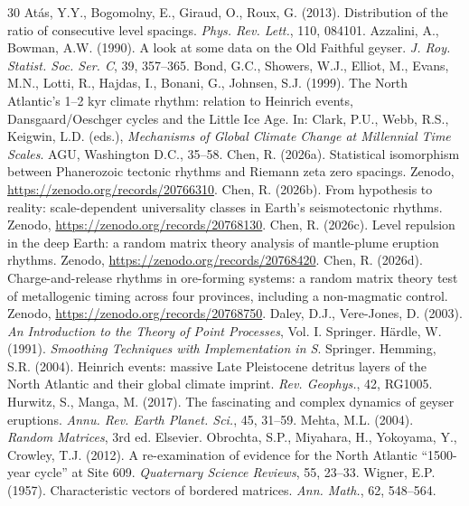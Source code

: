 \documentclass[12pt,a4paper]{article}
\begin{document}
\begin{thebibliography}{30}
 At\'as, Y.Y., Bogomolny, E., Giraud, O., Roux, G. (2013). Distribution of the ratio of consecutive level spacings. \textit{Phys. Rev. Lett.}, 110, 084101.
 Azzalini, A., Bowman, A.W. (1990). A look at some data on the Old Faithful geyser. \textit{J. Roy. Statist. Soc. Ser. C}, 39, 357--365.
 Bond, G.C., Showers, W.J., Elliot, M., Evans, M.N., Lotti, R., Hajdas, I., Bonani, G., Johnsen, S.J. (1999). The North Atlantic's 1--2 kyr climate rhythm: relation to Heinrich events, Dansgaard/Oeschger cycles and the Little Ice Age. In: Clark, P.U., Webb, R.S., Keigwin, L.D. (eds.), \textit{Mechanisms of Global Climate Change at Millennial Time Scales}. AGU, Washington D.C., 35--58.
 Chen, R. (2026a). Statistical isomorphism between Phanerozoic tectonic rhythms and Riemann zeta zero spacings. Zenodo, \url{https://zenodo.org/records/20766310}.
 Chen, R. (2026b). From hypothesis to reality: scale-dependent universality classes in Earth's seismotectonic rhythms. Zenodo, \url{https://zenodo.org/records/20768130}.
 Chen, R. (2026c). Level repulsion in the deep Earth: a random matrix theory analysis of mantle-plume eruption rhythms. Zenodo, \url{https://zenodo.org/records/20768420}.
 Chen, R. (2026d). Charge-and-release rhythms in ore-forming systems: a random matrix theory test of metallogenic timing across four provinces, including a non-magmatic control. Zenodo, \url{https://zenodo.org/records/20768750}.
 Daley, D.J., Vere-Jones, D. (2003). \textit{An Introduction to the Theory of Point Processes}, Vol. I. Springer.
 H\"ardle, W. (1991). \textit{Smoothing Techniques with Implementation in S}. Springer.
 Hemming, S.R. (2004). Heinrich events: massive Late Pleistocene detritus layers of the North Atlantic and their global climate imprint. \textit{Rev. Geophys.}, 42, RG1005.
 Hurwitz, S., Manga, M. (2017). The fascinating and complex dynamics of geyser eruptions. \textit{Annu. Rev. Earth Planet. Sci.}, 45, 31--59.
 Mehta, M.L. (2004). \textit{Random Matrices}, 3rd ed. Elsevier.
 Obrochta, S.P., Miyahara, H., Yokoyama, Y., Crowley, T.J. (2012). A re-examination of evidence for the North Atlantic ``1500-year cycle'' at Site 609. \textit{Quaternary Science Reviews}, 55, 23--33.
 Wigner, E.P. (1957). Characteristic vectors of bordered matrices. \textit{Ann. Math.}, 62, 548--564.
\end{thebibliography}
\end{document}
